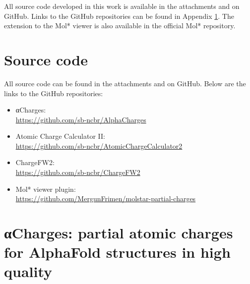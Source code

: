 \documentclass[
  digital,     %
  oneside,     %
  nosansbold,  %
  nocolorbold, %
  lof,         %
  lot,         %
]{fithesis4}
\begin{document}
All source code developed in this work is available in the attachments and on GitHub. Links to the GitHub repositories can be found in Appendix \ref{appendix:source-code}. The extension to the Mol* viewer is also available in the official Mol* repository. 

\printbibliography[heading=bibintoc]

\renewcommand\appendixname{Appendix}

\clearpage
\newpage

\begin{appendices}
  \chapter{Source code}
  \label{appendix:source-code}
  All source code can be found in the attachments and on GitHub. Below are the links to the GitHub repositories:
  \begin{itemize}
    \item αCharges: \\
    \url{https://github.com/sb-ncbr/AlphaCharges}
    \item Atomic Charge Calculator II: \\
    \url{https://github.com/sb-ncbr/AtomicChargeCalculator2}
    \item ChargeFW2: \\
    \url{https://github.com/sb-ncbr/ChargeFW2}
    \item Mol* viewer plugin: \\
    \url{https://github.com/MergunFrimen/molstar-partial-charges}
  \end{itemize}

  \chapter[αCharges paper]{αCharges: partial atomic charges for AlphaFold
  structures in high quality}
  \label{appendix:alpha-charges}
  
\end{appendices}
\end{document}
